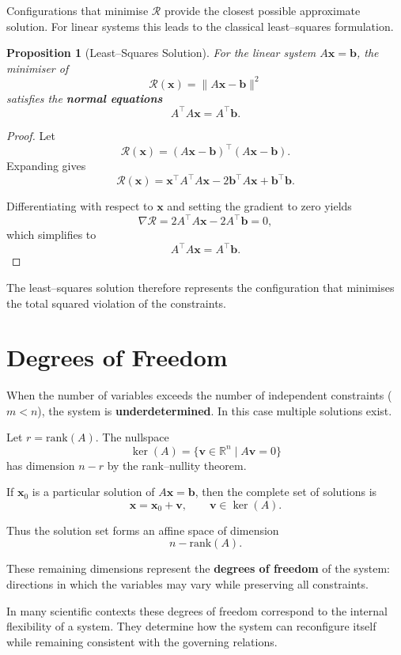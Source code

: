\documentclass[11pt, openany]{book}
\theoremstyle{plain}
\newtheorem{proposition}[theorem]{Proposition}
\theoremstyle{definition}
\theoremstyle{remark}
\begin{document}
Configurations that minimise $\mathcal{R}$ provide the closest possible
approximate solution. For linear systems this leads to the classical
least–squares formulation.

\begin{proposition}[Least–Squares Solution]
For the linear system $A\mathbf{x}=\mathbf{b}$, the minimiser of
\[
\mathcal{R}(\mathbf{x})=\|A\mathbf{x}-\mathbf{b}\|^{2}
\]
satisfies the \textbf{normal equations}
\[
A^{\top}A\mathbf{x}=A^{\top}\mathbf{b}.
\]
\end{proposition}

\begin{proof}
Let
\[
\mathcal{R}(\mathbf{x})=(A\mathbf{x}-\mathbf{b})^\top(A\mathbf{x}-\mathbf{b}).
\]
Expanding gives
\[
\mathcal{R}(\mathbf{x})
=\mathbf{x}^\top A^\top A\mathbf{x}
-2\mathbf{b}^\top A\mathbf{x}
+\mathbf{b}^\top\mathbf{b}.
\]

Differentiating with respect to $\mathbf{x}$ and setting the gradient to
zero yields
\[
\nabla\mathcal{R}
=2A^\top A\mathbf{x}-2A^\top\mathbf{b}=0,
\]
which simplifies to
\[
A^\top A\mathbf{x}=A^\top\mathbf{b}.
\]
\end{proof}

The least–squares solution therefore represents the configuration that
minimises the total squared violation of the constraints.

\section{Degrees of Freedom}

When the number of variables exceeds the number of independent
constraints ($m<n$), the system is \textbf{underdetermined}. In this case
multiple solutions exist.

Let $r=\mathrm{rank}(A)$. The nullspace
\[
\ker(A)=\{\mathbf{v}\in\mathbb{R}^n\mid A\mathbf{v}=0\}
\]
has dimension $n-r$ by the rank–nullity theorem.

If $\mathbf{x}_0$ is a particular solution of $A\mathbf{x}=\mathbf{b}$,
then the complete set of solutions is
\[
\mathbf{x}=\mathbf{x}_0+\mathbf{v},
\qquad
\mathbf{v}\in\ker(A).
\]

Thus the solution set forms an affine space of dimension
\[
n-\mathrm{rank}(A).
\]

These remaining dimensions represent the \textbf{degrees of freedom} of
the system: directions in which the variables may vary while preserving
all constraints.

In many scientific contexts these degrees of freedom correspond to the
internal flexibility of a system. They determine how the system can
reconfigure itself while remaining consistent with the governing
relations.
\end{document}
